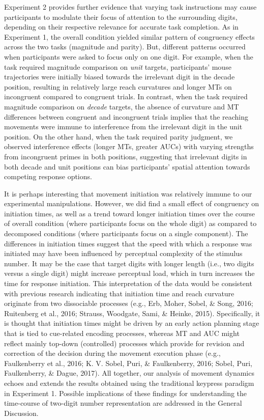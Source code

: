 \documentclass[english,man]{apa6}
\theoremstyle{definition}
\theoremstyle{definition}
\theoremstyle{definition}
\theoremstyle{remark}
\begin{document}
Experiment 2 provides further evidence that varying task instructions
may cause participants to modulate their focus of attention to the
surrounding digits, depending on their respective relevance for accurate
task completion. As in Experiment 1, the overall condition yielded
similar pattern of congruency effects across the two tasks (magnitude
and parity). But, different patterns occurred when participants were
asked to focus only on one digit. For example, when the task required
magnitude comparison on \emph{unit} targets, participants' mouse
trajectories were initially biased towards the irrelevant digit in the
decade position, resulting in relatively large reach curvatures and
longer MTs on incongruent compared to congruent trials. In contrast,
when the task required magnitude comparison on \emph{decade} targets,
the absence of curvature and MT differences between congruent and
incongruent trials implies that the reaching movements were immune to
interference from the irrelevant digit in the unit position. On the
other hand, when the task required parity judgment, we observed
interference effects (longer MTs, greater AUCs) with varying strengths
from incongruent primes in both positions, suggesting that irrelevant
digits in both decade and unit positions can bias participants' spatial
attention towards competing response options.

It is perhaps interesting that movement initiation was relatively immune
to our experimental manipulations. However, we did find a small effect
of congruency on initiation times, as well as a trend toward longer
initiation times over the course of overall condition (where
participants focus on the whole digit) as compared to decomposed
conditions (where participants focus on a single component). The
differences in initiation times suggest that the speed with which a
response was initiated may have been influenced by perceptual complexity
of the stimulus number. It may be the case that target digits with
longer length (i.e., two digits versus a single digit) might increase
perceptual load, which in turn increases the time for response
initiation. This interpretation of the data would be consistent with
previous research indicating that initiation time and reach curvature
originate from two dissociable processes (e.g., Erb, Moher, Sobel, \&
Song, 2016; Ruitenberg et al., 2016; Strauss, Woodgate, Sami, \& Heinke,
2015). Specifically, it is thought that initiation times might be driven
by an early action planning stage that is tied to cue-related encoding
processes, whereas MT and AUC might reflect mainly top-down (controlled)
processes which provide for revision and correction of the decision
during the movement execution phase (e.g., Faulkenberry et al., 2016; K.
V. Sobel, Puri, \& Faulkenberry, 2016; Sobel, Puri, Faulkenberry,
\& Dague, 2017). All together, our analysis of movement dynamics echoes
and extends the results obtained using the traditional keypress paradigm
in Experiment 1. Possible implications of these findings for
understanding the time-course of two-digit number representation are
addressed in the General Discussion.
\end{document}
